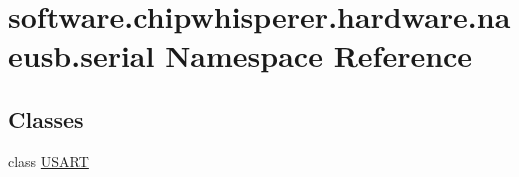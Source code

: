 \hypertarget{namespacesoftware_1_1chipwhisperer_1_1hardware_1_1naeusb_1_1serial}{}\section{software.\+chipwhisperer.\+hardware.\+naeusb.\+serial Namespace Reference}
\label{namespacesoftware_1_1chipwhisperer_1_1hardware_1_1naeusb_1_1serial}
\subsection*{Classes}
\begin{DoxyCompactItemize}
\item 
class \hyperlink{classsoftware_1_1chipwhisperer_1_1hardware_1_1naeusb_1_1serial_1_1USART}{U\+S\+A\+R\+T}
\end{DoxyCompactItemize}
